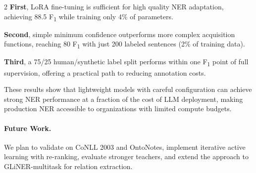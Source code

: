 \documentclass[11pt]{article}
\newcommand{\fone}{F\textsubscript{1}}
\begin{document}
\begin{multicols}{2}
\textbf{First}, LoRA fine-tuning is sufficient for high quality NER adaptation, achieving 88.5 \fone{} while training only 4\% of parameters.

\textbf{Second}, simple minimum confidence outperforms more complex acquisition functions, reaching 80 \fone{} with just 200 labeled sentences (2\% of training data).

\textbf{Third}, a 75/25 human/synthetic label split performs within one \fone{} point of full supervision, offering a practical path to reducing annotation costs.

These results show that lightweight models with careful configuration can achieve strong NER performance at a fraction of the cost of LLM deployment, making production NER accessible to organizations with limited compute budgets.

\paragraph{Future Work.} We plan to validate on CoNLL 2003 and OntoNotes, implement iterative active learning with re-ranking, evaluate stronger teachers, and extend the approach to GLiNER-multitask for relation extraction.

\end{multicols}



\end{document}
